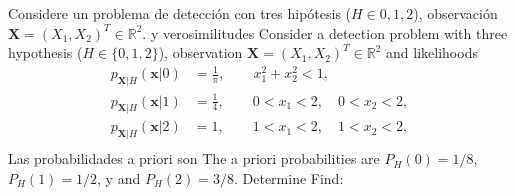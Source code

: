 \question[25] %

\ifspanish Considere un problema de detección con tres hipótesis ($H \in{0,1,2}$), observación $\mathbf{X} = (X_1, X_2)^T \in \mathbb{R}^2$. y verosimilitudes
\else Consider a detection problem with three hypothesis ($H \in\{0,1,2\}$), observation $\mathbf{X} = (X_1, X_2)^T \in \mathbb{R}^2$ and likelihoods
\fi
\begin{align*}
p_{\mathbf{X}|H}(\mathbf{x}|0) &= \frac{1}{\pi}, \qquad  x_1^2 + x_2^2 < 1,                \\
p_{\mathbf{X}|H}(\mathbf{x}|1) &= \frac{1}{4},   \qquad  0 < x_1 < 2,  \quad 0 < x_2 < 2,   \\
p_{\mathbf{X}|H}(\mathbf{x}|2) &= 1,             \qquad  1 < x_1 < 2,  \quad  1 < x_2 < 2,   \\
\end{align*}
\ifspanish Las probabilidades a priori son \else The a priori probabilities are \fi $P_H(0) = 1/8$, $P_H(1) = 1/2$, \ifspanish y \else and \fi $P_H(2) = 3/8$.
\ifspanish Determine \else Find: \fi
